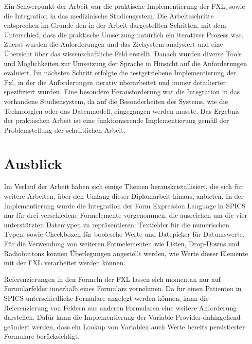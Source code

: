 Ein Schwerpunkt der Arbeit war die praktische Implementierung der FXL, sowie die Integration in das medizinische Studiensystem. Die Arbeitsschritte entsprechen im Grunde den in der Arbeit dargestellten Schritten, mit dem Unterschied, dass die praktische Umsetzung natürlich ein iterativer Prozess war. Zuerst wurden die Anforderungen und das Zielsystem analysiert und eine Übersicht über das wissenschaftliche Feld erstellt. Danach wurden diverse Tools und Möglichkeiten zur Umsetzung der Sprache in Hinsicht auf die Anforderungen evaluiert. Im nächsten Schritt erfolgte die testgetriebene Implementierung der Fxl, in der die Anforderungen iterativ überarbeitet und immer detailierter spezifiziert wurden. Eine besondere Herausforderung war die Integration in das vorhandene Studiensystem, da auf die Besonderheiten des Systems, wie die Technologien oder das Datenmodell, eingegangen werden musste. Das Ergebnis der praktischen Arbeit ist eine funktionierende Implementierung gemäß der Problemstellung der schriftlichen Arbeit.



\chapter{Ausblick}
\label{chapter_ausblick}

Im Verlauf der Arbeit haben sich einige Themen herauskristallisiert, die sich für weitere Arbeiten, über den Umfang dieser Diplomarbeit hinaus, anbieten. In der Implementierung wurde die Integration der Form Expression Language in SPICS nur für drei verschiedene Formelemente vorgenommen, die ausreichen um die vier unterstützten Datentypen zu repräsentieren: Textfelder für die numerischen Typen, sowie Checkboxen für boolesche Werte und Datepicker für Datumswerte. Für die Verwendung von weiteren Formelementen wie Listen, Drop-Downs und Radiobuttons können Überlegungen angestellt werden, wie Werte dieser Elemente mit der FXL verarbeitet werden können.

Referenzierungen in den Formeln der FXL lassen sich momentan nur auf Formularfelder innerhalb eines Formulars vornehmen. Da für einen Patienten in SPICS unterschiedliche Formulare angelegt werden können, kann die Referenzierung von Feldern aus anderen Formularen eine weitere Anforderung darstellen. Dafür kann die Implementierung der Variable Provider dahingehend geändert werden, dass ein Lookup von Variablen auch Werte bereits persistierter Formulare berücksichtigt. 

